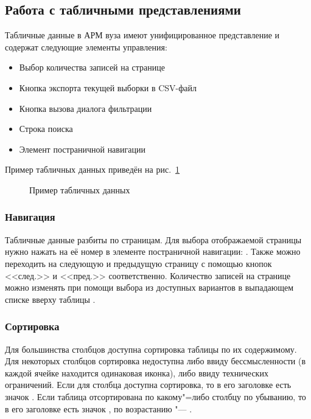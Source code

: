 \graphicspath{ {images/datatables/} }
\subsection{Работа с табличными представлениями} \label{sec:datatables}

Табличные данные в АРМ вуза имеют унифицированное представление и содержат следующие элементы управления:
\begin{itemize}
	\item Выбор количества записей на странице 
	\item Кнопка экспорта текущей выборки в CSV-файл 
	\item Кнопка вызова диалога фильтрации 
	\item Строка поиска 
	\item Элемент постраничной навигации 
\end{itemize}

Пример табличных данных приведён на рис.~\ref{img:datatables:dt}

\begin{figure}[H]
	\center{\texttt{[image: dt]}}
	\caption{Пример табличных данных}
	\label{img:datatables:dt}
\end{figure}

\subsubsection{Навигация}

Табличные данные разбиты по страницам. Для выбора отображаемой страницы нужно нажать на её номер
в элементе постраничной навигации: . 
Также можно переходить на следующую и предыдущую страницу с помощью 
кнопок <<след.>> и <<пред.>> соответственно. Количество записей на странице можно изменять при 
помощи выбора из доступных вариантов в выпадающем списке вверху таблицы .

\subsubsection{Сортировка}

Для большинства столбцов доступна сортировка таблицы по их содержимому. Для некоторых столбцов сортировка недоступна
либо ввиду бессмысленности (в каждой ячейке находится одинаковая иконка), либо ввиду технических ограничений.
Если для столбца доступна сортировка, то в его заголовке есть значок .
Если таблица отсортирована по какому"=либо столбцу по убыванию, то в его заголовке есть значок ,
по возрастанию "--- .

